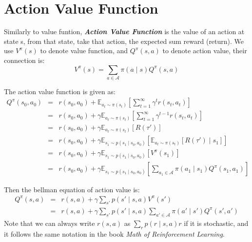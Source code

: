 \documentclass[10pt]{elegantbook}
\newcommand{\mydefination}[1]{\textbf{\textit{\textcolor{structurecolor}{#1}}}}
\begin{document}
\section{Action Value Function}
Similarly to value funtion, \mydefination{Action Value Function} is the value of an action at state s, 
from that state, take that action, the expected sum reward (return). We use $V^{\pi}(s)$ to denote value function, 
and $Q^{\pi}(s,a)$ to denote action value, their connection is:
\begin{equation}
    V^{\pi}(s) = \sum_{a \in \mathcal A}\pi(a\mid s) Q^{\pi}(s,a)
\end{equation} 

The action value function is given as:
\begin{equation}
    \begin{array}{lll}
    Q^{\pi}(s_0, a_0) &=& r(s_0, a_0) + \mathbb E_{a_t \sim \pi(s_t)}\left[ \sum_{t=1}^{\infty}\gamma^tr(s_t, a_t) \right] \\
                      &=& r(s_0, a_0) + \gamma \mathbb E_{a_t \sim \pi(s_t)}\left[ \sum_{t=1}^{\infty}\gamma^{t-1} r(s_t, a_t) \right] \\
                      &=& r(s_0, a_0) + \gamma \mathbb E_{a_t \sim \pi(s_t)}[R(\tau ')] \\
                      &=& r(s_0, a_0) + \gamma \mathbb E_{s_1 \sim p(s_1 \mid s_0, a_0)} \left [ \mathbb E_{a_t \sim \pi(s_t)}[R(\tau ') \mid s_1] \right ] \\
                      &=& r(s_0, a_0) + \gamma \mathbb E_{s_1 \sim p(s_1 \mid s_0, a_0)} [V^{\pi}(s_1)] \\
                      &=& r(s_0, a_0) + \gamma \mathbb E_{s_1 \sim p(s_1 \mid s_0, a_0)} \left [\sum_{a_1 \in \mathcal A}\pi(a_1 \mid s_1) Q^{\pi}(s_1, a_1) \right ]
    \end{array}
\end{equation} 

Then the bellman equation of action value is:
\begin{equation} \label{eq:bellman_equation_action}
    \begin{array}{lll}
    Q^{\pi}(s, a) &=& r(s, a) + \gamma \sum_{s'}p(s' \mid s, a)V^{\pi}(s') \\
                  &=& r(s, a) + \gamma \sum_{s'}p(s' \mid s, a)\sum_{a' \in \mathcal A}\pi(a' \mid s')Q^{\pi}(s', a')
    \end{array}
\end{equation} 
Note that we can always write $r(s, a)$ as $\sum_r p(r \mid s, a) r$ if it is stochastic, and it follows the same notation
in the book \textit{Math of Reinforcement Learning}.
\end{document}
